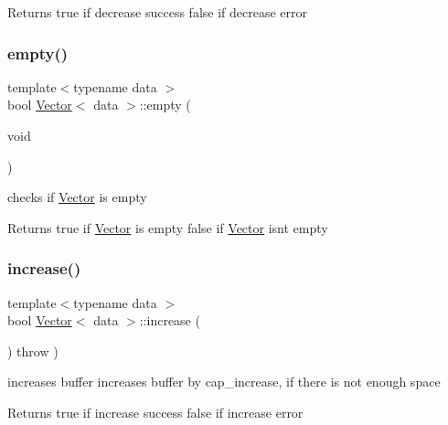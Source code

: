 \begin{DoxyReturn}{Returns}
true if decrease success false if decrease error 
\end{DoxyReturn}
\mbox{\label{classVector_ae203aae4d9a6dbabd4883c9e6fd84f79}} 
\subsubsection{\texorpdfstring{empty()}{empty()}}
{\footnotesize\ttfamily template$<$typename data $>$ \\
bool \hyperlink{classVector}{Vector}$<$ data $>$\+::empty (\begin{DoxyParamCaption}\item[{void}]{ }\end{DoxyParamCaption})}



checks if \hyperlink{classVector}{Vector} is empty 

\begin{DoxyReturn}{Returns}
true if \hyperlink{classVector}{Vector} is empty false if \hyperlink{classVector}{Vector} isn\textquotesingle{}t empty 
\end{DoxyReturn}
\mbox{\label{classVector_afa2a3c5660a7a34794975a6bb80d175f}} 
\subsubsection{\texorpdfstring{increase()}{increase()}}
{\footnotesize\ttfamily template$<$typename data $>$ \\
bool \hyperlink{classVector}{Vector}$<$ data $>$\+::increase (\begin{DoxyParamCaption}{ }\end{DoxyParamCaption}) throw  ) \hspace{0.3cm}{\ttfamily [private]}}



increases buffer  increases buffer by cap\+\_\+increase, if there is not enough space 

\begin{DoxyReturn}{Returns}
true if increase success false if increase error 
\end{DoxyReturn}
\mbox{\label{classVector_a7994afefee442d3980f1b1125152fe50}} 
